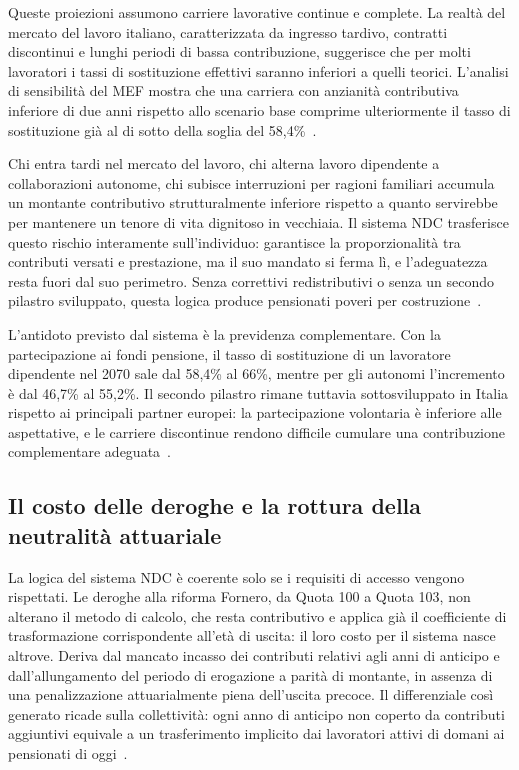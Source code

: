 Queste proiezioni assumono carriere lavorative continue e complete. La realtà del mercato del lavoro italiano, caratterizzata da ingresso tardivo, contratti discontinui e lunghi periodi di bassa contribuzione, suggerisce che per molti lavoratori i tassi di sostituzione effettivi saranno inferiori a quelli teorici. L'analisi di sensibilità del MEF mostra che una carriera con anzianità contributiva inferiore di due anni rispetto allo scenario base comprime ulteriormente il tasso di sostituzione già al di sotto della soglia del 58,4\%~\cite{LavoceGiovani, MEF_RGS2025}.

Chi entra tardi nel mercato del lavoro, chi alterna lavoro dipendente a collaborazioni autonome, chi subisce interruzioni per ragioni familiari accumula un montante contributivo strutturalmente inferiore rispetto a quanto servirebbe per mantenere un tenore di vita dignitoso in vecchiaia. Il sistema NDC trasferisce questo rischio interamente sull'individuo: garantisce la proporzionalità tra contributi versati e prestazione, ma il suo mandato si ferma lì, e l'adeguatezza resta fuori dal suo perimetro. Senza correttivi redistributivi o senza un secondo pilastro sviluppato, questa logica produce pensionati poveri per costruzione~\cite{Bosi2018, LavoceGiovani}.

L'antidoto previsto dal sistema è la previdenza complementare. Con la partecipazione ai fondi pensione, il tasso di sostituzione di un lavoratore dipendente nel 2070 sale dal 58,4\% al 66\%, mentre per gli autonomi l'incremento è dal 46,7\% al 55,2\%. Il secondo pilastro rimane tuttavia sottosviluppato in Italia rispetto ai principali partner europei: la partecipazione volontaria è inferiore alle aspettative, e le carriere discontinue rendono difficile cumulare una contribuzione complementare adeguata~\cite{MEF_RGS2025}.

\subsection{Il costo delle deroghe e la rottura della neutralità attuariale}

La logica del sistema NDC è coerente solo se i requisiti di accesso vengono rispettati. Le deroghe alla riforma Fornero, da Quota 100 a Quota 103, non alterano il metodo di calcolo, che resta contributivo e applica già il coefficiente di trasformazione corrispondente all'età di uscita: il loro costo per il sistema nasce altrove. Deriva dal mancato incasso dei contributi relativi agli anni di anticipo e dall'allungamento del periodo di erogazione a parità di montante, in assenza di una penalizzazione attuarialmente piena dell'uscita precoce. Il differenziale così generato ricade sulla collettività: ogni anno di anticipo non coperto da contributi aggiuntivi equivale a un trasferimento implicito dai lavoratori attivi di domani ai pensionati di oggi~\cite{LavoceRiformaDini, Bosi2018}.

